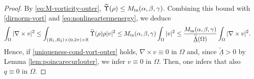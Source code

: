 \documentclass[a4paper,11pt]{amsart}
\numberwithin{equation}{section}
\numberwithin{figure}{section}
\begin{document}
\begin{proof}
	By \eqref{eq:M-vorticity-outer}, $\widetilde\Upsilon(\rho)\leq {M}_{\rm in}(\alpha,\beta,\gamma)$. Combining this bound with \eqref{dirnorm-vort} and \eqref{eq:nonlineartermenergy}, we deduce
	\begin{equation*}
		\int_\Omega |\nabla\times v|^2 \leq \int_{(R_1,R_2)\times (0,2\pi)\times \mathbb{R}} \widetilde{\Upsilon}(\rho)\rho |v|^2\leq {M}_{\rm in}(\alpha,\beta,\gamma)\int_\Omega |v|^2\leq \frac{{M}_{\rm in}(\alpha,\beta,\gamma)}{\underline{\widetilde{\Lambda}}(\Omega)}\int_\Omega |\nabla\times v|^2.
	\end{equation*}
	Hence, if \eqref{uniqueness-cond-vort-outer} holds, $\nabla\times v\equiv0$ in $\Omega$ and, since $\widetilde{\underline{\Lambda}}>0$ by Lemma \ref{lem:poincarecurlouter}, we infer $v\equiv0$ in $\Omega$. Then, one infers that also $q\equiv0$ in $\Omega$.\end{proof}
\end{document}
